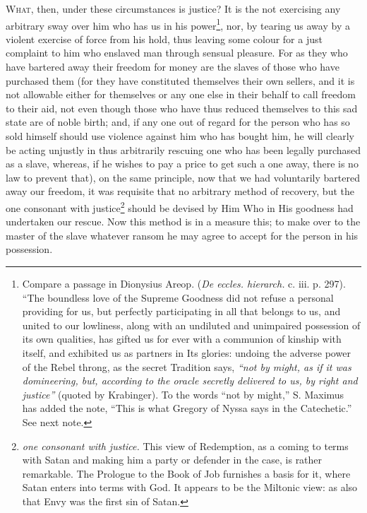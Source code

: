 \textsc{What}, then, under these circumstances is justice? It is the not exercising any arbitrary sway over him who has us in his power\footnote{Compare a passage in Dionysius Areop. (\emph{De eccles. hierarch.} c. iii. p. 297). “The boundless love of the Supreme Goodness did not refuse a personal providing for us, but perfectly participating in all that belongs to us, and united to our lowliness, along with an undiluted and unimpaired possession of its own qualities, has gifted us for ever with a communion of kinship with itself, and exhibited us as partners in Its glories: undoing the adverse power of the Rebel throng, as the secret Tradition says, \emph{“not by might, as if it was domineering, but, according to the oracle secretly delivered to us, by right and justice”} (quoted by Krabinger). To the words “not by might,” S. Maximus has added the note, “This is what Gregory of Nyssa says in the Catechetic.” See next note.}, nor, by tearing us away by a violent exercise of force from his hold, thus leaving some colour for a just complaint to him who enslaved man through sensual pleasure. For as they who have bartered away their freedom for money are the slaves of those who have purchased them (for they have constituted themselves their own sellers, and it is not allowable either for themselves or any one else in their behalf to call freedom to their aid, not even though those who have thus reduced themselves to this sad state are of noble birth; and, if any one out of regard for the person who has so sold himself should use violence against him who has bought him, he will clearly be acting unjustly in thus arbitrarily rescuing one who has been legally purchased as a slave, whereas, if he wishes to pay a price to get such a one away, there is no law to prevent that), on the same principle, now that we had voluntarily bartered away our freedom, it was requisite that no arbitrary method of recovery, but the one consonant with justice\footnote{\emph{one consonant with justice.} This view of Redemption, as a coming to terms with Satan and making him a party or defender in the case, is rather remarkable. The Prologue to the Book of Job furnishes a basis for it, where Satan enters into terms with God. It appears to be the Miltonic view: as also that Envy was the first sin of Satan.} should be devised by Him Who in His goodness had undertaken our rescue. Now this method is in a measure this; to make over to the master of the slave whatever ransom he may agree to accept for the person in his possession.


